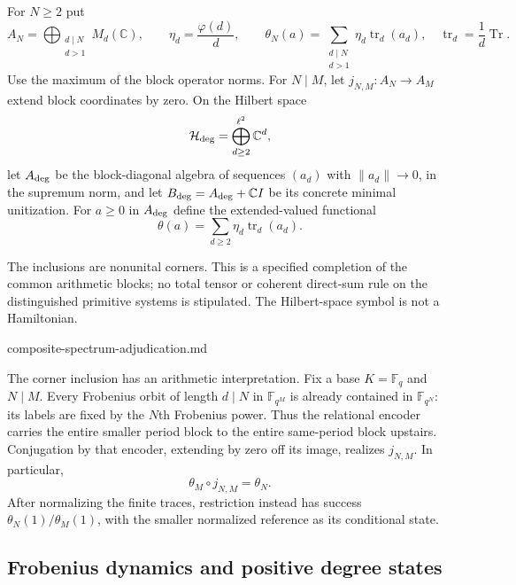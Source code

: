 \begin{definition}
For $N\geq2$ put
\[
 A_N=\bigoplus_{\substack{d\mid N\\d>1}}M_d(\mathbb C),\qquad
 \eta_d=\frac{\varphi(d)}d,\qquad
 \theta_N(a)=\sum_{\substack{d\mid N\\d>1}}\eta_d\operatorname{tr}_d(a_d),
 \quad \operatorname{tr}_d=\frac1d\operatorname{Tr}.
\]
Use the maximum of the block operator norms. For $N\mid M$, let
$j_{N,M}:A_N\to A_M$ extend block coordinates by zero.
On the Hilbert space
\[
 \mathcal H_{\rm deg}=\bigoplus_{d\geq2}^{\ell^2}\mathbb C^d,
\]
let $A_{\rm deg}$ be the block-diagonal algebra of sequences $(a_d)$ with
$\|a_d\|\to0$, in the supremum norm, and let
$B_{\rm deg}=A_{\rm deg}+\mathbb C I$ be its concrete minimal unitization.
For $a\geq0$ in $A_{\rm deg}$ define the extended-valued functional
\[
 \theta(a)=\sum_{d\geq2}\eta_d\operatorname{tr}_d(a_d).
\]
\end{definition}
\begin{scope}
The inclusions are nonunital corners. This is a specified completion of
the common arithmetic blocks; no total tensor or coherent direct-sum rule
on the distinguished primitive systems is stipulated. The Hilbert-space
symbol is not a Hamiltonian.
\end{scope}
{composite-spectrum-adjudication.md}

The corner inclusion has an arithmetic interpretation. Fix a base
$K=\mathbb F_q$ and $N\mid M$. Every Frobenius orbit of length $d\mid N$
in $\mathbb F_{q^M}$ is already contained in $\mathbb F_{q^N}$: its labels
are fixed by the $N$th Frobenius power. Thus the relational encoder carries
the entire smaller period block to the entire same-period block upstairs.
Conjugation by that encoder, extending by zero off its image, realizes
$j_{N,M}$. In particular,
\[
 \theta_M\circ j_{N,M}=\theta_N.
\]
After normalizing the finite traces, restriction instead has success
$\theta_N(1)/\theta_M(1)$, with the smaller normalized reference as its
conditional state.

\subsection{Frobenius dynamics and positive degree states}

